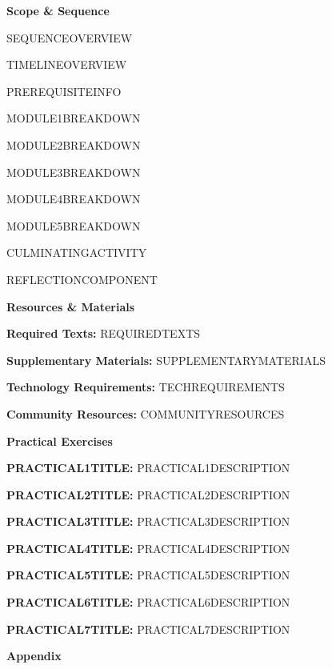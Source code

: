 \documentclass{article}
\begin{document}
\pagebreak

{\huge \textbf{Scope \& Sequence}}

SEQUENCEOVERVIEW

TIMELINEOVERVIEW

PREREQUISITEINFO

MODULE1BREAKDOWN

MODULE2BREAKDOWN

MODULE3BREAKDOWN

MODULE4BREAKDOWN

MODULE5BREAKDOWN

CULMINATINGACTIVITY

REFLECTIONCOMPONENT

\pagebreak

{\huge \textbf{Resources \& Materials}}

\textbf{Required Texts:} REQUIREDTEXTS

\textbf{Supplementary Materials:} SUPPLEMENTARYMATERIALS

\textbf{Technology Requirements:} TECHREQUIREMENTS

\textbf{Community Resources:} COMMUNITYRESOURCES

\vspace{1cm}

\pagebreak

{\huge \textbf{Practical Exercises}}

\textbf{PRACTICAL1TITLE:} PRACTICAL1DESCRIPTION
 	
\textbf{PRACTICAL2TITLE:} PRACTICAL2DESCRIPTION
 	
\textbf{PRACTICAL3TITLE:} PRACTICAL3DESCRIPTION
 	
\textbf{PRACTICAL4TITLE:} PRACTICAL4DESCRIPTION
 	
\textbf{PRACTICAL5TITLE:} PRACTICAL5DESCRIPTION
 	
\textbf{PRACTICAL6TITLE:} PRACTICAL6DESCRIPTION
 	
\textbf{PRACTICAL7TITLE:} PRACTICAL7DESCRIPTION



\vspace{1cm}

\pagebreak

{\huge \textbf{Appendix}}

\vspace{1cm}
\end{document}
